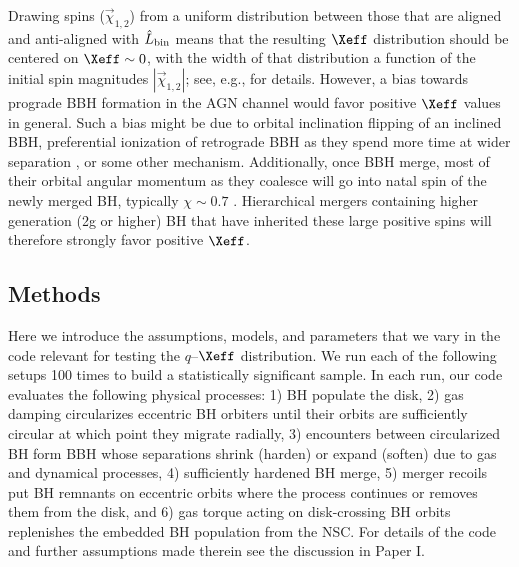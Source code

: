 Drawing spins ($\vec{\chi}_{1,2}$) from a uniform distribution between those that are aligned and anti-aligned with $\hat{L}_{\rm bin}$ means that the resulting $\Xeff$ distribution should be centered on $\Xeff \sim 0$, with the width of that distribution a function of the initial spin magnitudes $|\vec{\chi}_{1,2}|$; see, e.g., \cite{Callister21} for details.
However, a bias towards prograde BBH formation in the AGN channel would favor positive $\Xeff$ values in general.
Such a bias might be due to orbital inclination flipping \citep{DittmannDempseyLi24} of an inclined BBH, preferential ionization of retrograde BBH as they spend more time at wider separation \citep[on average,][]{Wang+21,Calcino+23}, or some other mechanism.
Additionally, once BBH merge, most of their orbital angular momentum as they coalesce will go into natal spin of the newly merged BH, typically $\chi \sim 0.7$ \citep{TichyMarronetti08}.
Hierarchical mergers containing higher generation (2g or higher) BH that have inherited these large positive spins will therefore strongly favor positive $\Xeff$.



\subsection{Methods}
\label{sec:methods-ch2}

Here we introduce the assumptions, models, and parameters that we vary in the  code relevant for testing the $q$--$\Xeff$ distribution.
We run each of the following setups 100 times to build a statistically significant sample.
In each run, our code evaluates the following physical processes: 1) BH populate the disk, 2) gas damping circularizes eccentric BH orbiters until their orbits are sufficiently circular at which point they migrate radially, 3) encounters between circularized BH form BBH whose separations shrink (harden) or expand (soften) due to gas and dynamical processes, 4) sufficiently hardened BH merge, 5) merger recoils put BH remnants on eccentric orbits where the process continues or removes them from the disk, and 6) gas torque acting on disk-crossing BH orbits replenishes the embedded BH population from the NSC.
For details of the code and further assumptions made therein see the discussion in Paper I.

